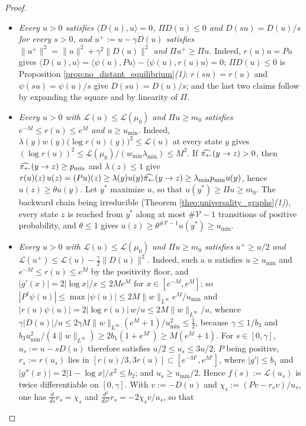 \begin{proof}
\begin{itemize}
    \item \emph{Every $u>0$ satisfies $\langle D(u),u\rangle=0$, $\Pi D(u)\leq0$ and $D(su)=D(u)/s$ for every $s>0$, and $u^+:=u-\gamma D(u)$ satisfies $\|u^+\|^2=\|u\|^2+\gamma^2\|D(u)\|^2$ and $\Pi u^+\geq\Pi u$.} Indeed, $r(u)u=Pu$ gives $\langle D(u),u\rangle=\langle\psi(u),Pu\rangle-\langle\psi(u),r(u)u\rangle=0$; $\Pi D(u)\leq0$ is Proposition \ref{prop:no_distant_equilibrium}\emph{(1)}; $r(su)=r(u)$ and $\psi(su)=\psi(u)/s$ give $D(su)=D(u)/s$; and the last two claims follow by expanding the square and by linearity of $\Pi$.
    \item \emph{Every $u>0$ with $\mathcal L(u)\leq\mathcal L(\mu_0)$ and $\Pi u\geq m_0$ satisfies $e^{-M}\leq r(u)\leq e^M$ and $u\geq u_{\min}$.} Indeed, $\lambda(y)w(y)\bigl(\log r(u)(y)\bigr)^2\leq\mathcal L(u)$ at every state $y$ gives $(\log r(u))^2\leq\mathcal L(\mu_0)/(w_{\min}\lambda_{\min})\leq M^2$. If $\widehat{\pi_{\leftarrow}}(y\rightarrow z)>0$, then $\widehat{\pi_{\leftarrow}}(y\rightarrow z)\geq p_{\min}$ and $\lambda(z)\leq1$ give $r(u)(z)\,u(z)=(Pu)(z)\geq\lambda(y)u(y)\widehat{\pi_{\leftarrow}}(y\rightarrow z)\geq\lambda_{\min}p_{\min}u(y)$, hence $u(z)\geq\theta u(y)$. Let $y^*$ maximize $u$, so that $u(y^*)\geq\Pi u\geq m_0$. The backward chain being irreducible (Theorem \ref{theo:universality_graphs}\emph{(1)}), every state $z$ is reached from $y^*$ along at most $\#\mathcal V-1$ transitions of positive probability, and $\theta\leq1$ gives $u(z)\geq\theta^{\#\mathcal V-1}u(y^*)\geq u_{\min}$.
    \item \emph{Every $u>0$ with $\mathcal L(u)\leq\mathcal L(\mu_0)$ and $\Pi u\geq m_0$ satisfies $u^+\geq u/2$ and $\mathcal L(u^+)\leq\mathcal L(u)-\frac\gamma2\|D(u)\|^2$.} Indeed, such a $u$ satisfies $u\geq u_{\min}$ and $e^{-M}\leq r(u)\leq e^M$ by the positivity floor, and $|g'(x)|=2|\log x|/x\leq2Me^M$ for $x\in[e^{-M},e^M]$; so $|P^\dagger\psi(u)|\leq\max|\psi(u)|\leq2M\|w\|_{L^\infty}e^M/u_{\min}$ and $|r(u)\psi(u)|=2|\log r(u)|\,w/u\leq2M\|w\|_{L^\infty}/u$, whence $\gamma|D(u)|/u\leq2\gamma M\|w\|_{L^\infty}(e^M+1)/u_{\min}^2\leq\frac12$, because $\gamma\leq1/b_3$ and $b_3u_{\min}^2/(4\|w\|_{L^\infty})\geq2b_1(1+e^{M'})\geq M(e^M+1)$. For $s\in[0,\gamma]$, $u_s:=u-sD(u)$ therefore satisfies $u/2\leq u_s\leq3u/2$; $P$ being positive, $r_s:=r(u_s)$ lies in $[r(u)/3,3r(u)]\subset[e^{-M'},e^{M'}]$, where $|g'|\leq b_1$ and $|g''(x)|=2|1-\log x|/x^2\leq b_2$; and $u_s\geq u_{\min}/2$. Hence $f(s):=\mathcal L(u_s)$ is twice differentiable on $[0,\gamma]$. With $v:=-D(u)$ and $\chi_s:=(Pv-r_sv)/u_s$, one has $\frac{d}{ds}r_s=\chi_s$ and $\frac{d^2}{ds^2}r_s=-2\chi_sv/u_s$, so that

\end{itemize}
\end{proof}
